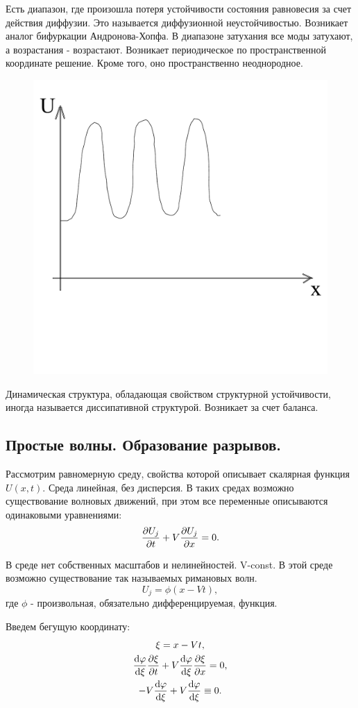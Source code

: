Есть диапазон, где произошла потеря устойчивости состояния равновесия за счет действия диффузии. Это называется диффузионной неустойчивостью. Возникает аналог бифуркации Андронова-Хопфа. В диапазоне затухания все моды затухают, а возрастания - возрастают. Возникает периодическое по пространственной координате решение. Кроме того, оно пространственно неоднородное.  
\begin{figure}[H]
	\centering
	\includegraphics[width=0.5\linewidth]{fig/fig10.pdf}   
\end{figure}

Динамическая структура, обладающая свойством структурной устойчивости, иногда называется диссипативной структурой. Возникает за счет баланса. 

\subsection{Простые волны. Образование разрывов.}
Рассмотрим равномерную среду, свойства которой описывает скалярная функция $U(x,t)$. Среда линейная, без дисперсия. В таких средах возможно существование волновых движений, при этом все переменные описываются одинаковыми уравнениями:
\begin{equation}
	\pdv{U_j}{t}+V\pdv{U_j}{x}=0.
	\label{eq:25}
\end{equation}

В среде нет собственных масштабов и нелинейностей. V-const. В этой среде возможно существование так называемых римановых волн. 
\begin{equation}
	U_j=\phi(x-Vt),
	\label{eq:26}
\end{equation}
где $\phi$ - произвольная, обязательно дифференцируемая, функция.

Введем бегущую координату:
\begin{gather*}
	\xi=x-Vt, \\ \dv{\varphi}{\xi} \pdv{\xi}{t}+V\dv{\varphi}{\xi} \pdv{\xi}{x}=0, \\ -V\dv{\varphi}{\xi}+V\dv{\varphi}{\xi} \equiv 0.
\end{gather*}

